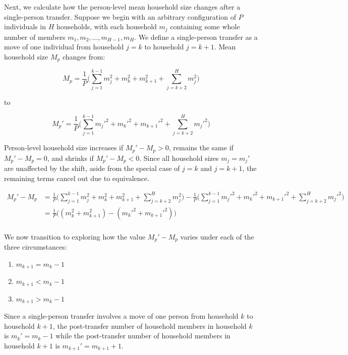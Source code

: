 \documentclass[
]{article}
\providecommand{\tightlist}{%
  \setlength{\itemsep}{0pt}\setlength{\parskip}{0pt}}
\begin{document}
Next, we calculate how the person-level mean household size changes
after a single-person transfer. Suppose we begin with an arbitrary
configuration of \(P\) individuals in \(H\) households, with each
household \(m_j\) containing some whole number of members
\(m_1, m_2, \ldots, m_{H-1}, m_H\). We define a single-person transfer
as a move of one individual from household \(j = k\) to household
\(j = k+1\). Mean household size \(M_p\) changes from:

\begin{equation}
M_p =\frac{1}{P} \bigg( \sum_{j = 1}^{k-1} m_j^2 + m_k^2 + m_{k+1}^2 +  \sum_{j = k+2}^{H}m_j^2 \bigg)
\end{equation}

to

\begin{equation}
M_p' =\frac{1}{P} \bigg( \sum_{j = 1}^{k-1} m_j'^2 + m_k'^2 + m_{k+1}'^2 + \sum_{j = k+2}^{H}m_j'^2 \bigg)
\end{equation}

Person-level household size increases if \(M_p' - M_p > 0\), remains the
same if \(M_p' - M_p = 0\), and shrinks if \(M_p' - M_p < 0\). Since all
household sizes \(m_j = m_j'\) are unaffected by the shift, aside from
the special case of \(j = k\) and \(j = k+1\), the remaining terms
cancel out due to equivalence.

\begin{align}
M_p' - M_p & = \frac{1}{P} \bigg( \sum_{j = 1}^{k-1} m_j^2 + m_k^2 + m_{k+1}^2 +  \sum_{j = k+2}^{H}m_j^2 \bigg) - \frac{1}{P} \bigg( \sum_{j = 1}^{k-1} m_j'^2 + m_k'^2 + m_{k+1}'^2 + \sum_{j = k+2}^{H}m_j'^2 \bigg) \\
\label{eq:3}
\tag{3}
& = \frac{1}{P} \bigg( (m_k^2 + m_{k+1}^2) - (m_k'^2 + m_{k+1}'^2) \bigg) \\
\end{align}

We now transition to exploring how the value \(M_p' - M_p\) varies under
each of the three circumstances:

\begin{enumerate}
\def\labelenumi{\arabic{enumi}.}
\tightlist
\item
  \(m_{k+1} = m_k - 1\)
\item
  \(m_{k+1} < m_k - 1\)
\item
  \(m_{k+1} > m_k - 1\)
\end{enumerate}

Since a single-person transfer involves a move of one person from
household \(k\) to household \(k+1\), the post-transfer number of
household members in household \(k\) is \(m_k' = m_k - 1\) while the
post-transfer number of household members in household \(k+1\) is
\(m_{k+1}' = m_{k+1} + 1\).
\end{document}

